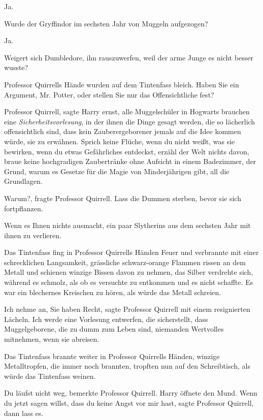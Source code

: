 \glqq{}Ja.\grqq{}

\glqq{}Wurde der Gryffindor im sechsten Jahr von Muggeln aufgezogen?\grqq{}

\glqq{}Ja.\grqq{}

\glqq{}Weigert sich Dumbledore, ihn rauszuwerfen, weil der arme Junge es nicht
besser wusste?\grqq{}

Professor Quirrells Hände wurden auf dem Tintenfass bleich. \glqq{}Haben Sie ein
Argument, Mr. Potter, oder stellen Sie nur das Offensichtliche fest?\grqq{}

\glqq{}Professor Quirrell\grqq{}, sagte Harry ernst, \glqq{}alle Muggelschüler in
Hogwarts brauchen eine \emph{Sicherheitsvorlesung}, in der ihnen die Dinge
gesagt werden, die so lächerlich offensichtlich sind, dass kein
Zauberergeborener jemals auf die Idee kommen würde, sie zu erwähnen. Sprich
keine Flüche, wenn du nicht weißt, was sie bewirken, wenn du etwas Gefährliches
entdeckst, erzähl der Welt nichts davon, braue keine hochgradigen Zaubertränke
ohne Aufsicht in einem Badezimmer, der Grund, warum es Gesetze für die Magie von
Minderjährigen gibt, all die Grundlagen.\grqq{}

\glqq{}Warum?\grqq{}, fragte Professor Quirrell. \glqq{}Lass die Dummen sterben,
bevor sie sich fortpflanzen.\grqq{}

\glqq{}Wenn es Ihnen nichts ausmacht, ein paar Slytherins aus dem sechsten Jahr
mit ihnen zu verlieren.\grqq{}

Das Tintenfass fing in Professor Quirrells Händen Feuer und verbrannte mit einer
schrecklichen Langsamkeit, grässliche schwarz-orange Flammen rissen an dem
Metall und schienen winzige Bissen davon zu nehmen, das Silber verdrehte sich,
während es schmolz, als ob es versuchte zu entkommen und es nicht schaffte. Es
war ein blechernes Kreischen zu hören, als würde das Metall schreien.

\glqq{}Ich nehme an, Sie haben Recht\grqq{}, sagte Professor Quirrell mit einem
resignierten Lächeln. \glqq{}Ich werde eine Vorlesung entwerfen, die
sicherstellt, dass Muggelgeborene, die zu dumm zum Leben sind, niemanden
Wertvolles mitnehmen, wenn sie abreisen.\grqq{}

Das Tintenfass brannte weiter in Professor Quirrells Händen, winzige
Metalltropfen, die immer noch brannten, tropften nun auf den Schreibtisch, als
würde das Tintenfass weinen.

\glqq{}Du läufst nicht weg\grqq{}, bemerkte Professor Quirrell. Harry öffnete den
Mund. \glqq{}Wenn du jetzt sagen willst, dass du keine Angst vor mir hast\grqq{},
sagte Professor Quirrell, \glqq{}dann lass es.\grqq{}

